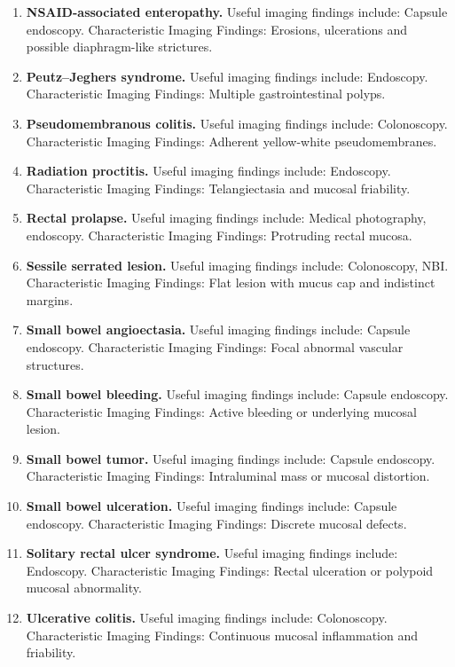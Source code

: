 \begin{enumerate}[leftmargin=*,itemsep=0.45em,topsep=0.4em]
\item \textbf{NSAID-associated enteropathy.} Useful imaging findings include: Capsule endoscopy. Characteristic Imaging Findings: Erosions, ulcerations and possible diaphragm-like strictures.
\item \textbf{Peutz--Jeghers syndrome.} Useful imaging findings include: Endoscopy. Characteristic Imaging Findings: Multiple gastrointestinal polyps.
\item \textbf{Pseudomembranous colitis.} Useful imaging findings include: Colonoscopy. Characteristic Imaging Findings: Adherent yellow-white pseudomembranes.
\item \textbf{Radiation proctitis.} Useful imaging findings include: Endoscopy. Characteristic Imaging Findings: Telangiectasia and mucosal friability.
\item \textbf{Rectal prolapse.} Useful imaging findings include: Medical photography, endoscopy. Characteristic Imaging Findings: Protruding rectal mucosa.
\item \textbf{Sessile serrated lesion.} Useful imaging findings include: Colonoscopy, NBI. Characteristic Imaging Findings: Flat lesion with mucus cap and indistinct margins.
\item \textbf{Small bowel angioectasia.} Useful imaging findings include: Capsule endoscopy. Characteristic Imaging Findings: Focal abnormal vascular structures.
\item \textbf{Small bowel bleeding.} Useful imaging findings include: Capsule endoscopy. Characteristic Imaging Findings: Active bleeding or underlying mucosal lesion.
\item \textbf{Small bowel tumor.} Useful imaging findings include: Capsule endoscopy. Characteristic Imaging Findings: Intraluminal mass or mucosal distortion.
\item \textbf{Small bowel ulceration.} Useful imaging findings include: Capsule endoscopy. Characteristic Imaging Findings: Discrete mucosal defects.
\item \textbf{Solitary rectal ulcer syndrome.} Useful imaging findings include: Endoscopy. Characteristic Imaging Findings: Rectal ulceration or polypoid mucosal abnormality.
\item \textbf{Ulcerative colitis.} Useful imaging findings include: Colonoscopy. Characteristic Imaging Findings: Continuous mucosal inflammation and friability.
\end{enumerate}

